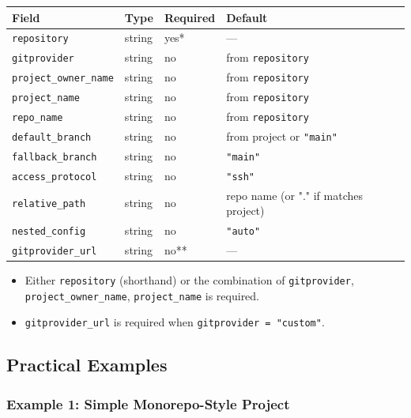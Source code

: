 \begin{center}
\begin{tabular}{llll}
\textbf{Field} & \textbf{Type} & \textbf{Required} & \textbf{Default} \\ \hline
\texttt{repository} & string & yes* & — \\
\texttt{gitprovider} & string & no & from \texttt{repository} \\
\texttt{project\_owner\_name} & string & no & from \texttt{repository} \\
\texttt{project\_name} & string & no & from \texttt{repository} \\
\texttt{repo\_name} & string & no & from \texttt{repository} \\
\texttt{default\_branch} & string & no & from project or \texttt{"main"} \\
\texttt{fallback\_branch} & string & no & \texttt{"main"} \\
\texttt{access\_protocol} & string & no & \texttt{"ssh"} \\
\texttt{relative\_path} & string & no & repo name (or "." if matches project) \\
\texttt{nested\_config} & string & no & \texttt{"auto"} \\
\texttt{gitprovider\_url} & string & no** & — \\ \hline
\end{tabular}
\end{center}

\begin{itemize}
  \item[*] Either \texttt{repository} (shorthand) or the combination of
        \texttt{gitprovider}, \texttt{project\_owner\_name}, \texttt{project\_name}
        is required.
  \item[**] \texttt{gitprovider\_url} is required when \texttt{gitprovider = "custom"}.
\end{itemize}

\subsection{Practical Examples}
\label{subsec:cgs-examples}

\subsubsection{Example 1: Simple Monorepo-Style Project}

